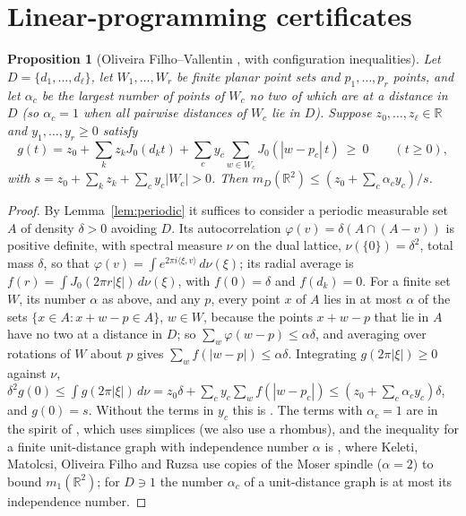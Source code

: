 \documentclass[11pt,a4paper]{amsart}
\newtheorem{proposition}[theorem]{Proposition}
\theoremstyle{definition}
\theoremstyle{remark}
\newcommand{\R}{\mathbb{R}}
\begin{document}
\section{Linear-programming certificates}\label{sec:lp}

\begin{proposition}[Oliveira Filho--Vallentin \cite{OFV}, with configuration inequalities]\label{prop:lp}
Let $D=\{d_1,\dots,d_\ell\}$, let $W_1,\dots,W_r$ be finite planar point sets and $p_1,\dots,p_r$ points, and let
$\alpha_c$ be the largest number of points of $W_c$ no two of which are at a distance in $D$ (so $\alpha_c=1$ when all
pairwise distances of $W_c$ lie in $D$). Suppose $z_0,\dots,z_\ell\in\R$ and $y_1,\dots,y_r\ge0$ satisfy
\[
g(t)=z_0+\sum_{k}z_kJ_0(d_kt)+\sum_cy_c\sum_{w\in W_c}J_0(|w-p_c|\,t)\ \ge\ 0\qquad(t\ge0),
\]
with $s=z_0+\sum_kz_k+\sum_cy_c|W_c|>0$. Then $m_D(\R^2)\le(z_0+\sum_c\alpha_cy_c)/s$.
\end{proposition}

\begin{proof}
By Lemma~\ref{lem:periodic} it suffices to consider a periodic measurable set $A$ of density $\delta>0$ avoiding
$D$. Its autocorrelation $\varphi(v)=\delta(A\cap(A-v))$ is positive definite, with spectral measure $\nu$ on the dual
lattice, $\nu(\{0\})=\delta^2$, total mass $\delta$, so that $\varphi(v)=\int e^{2\pi i\langle\xi,v\rangle}\,d\nu(\xi)$;
its radial average is $f(r)=\int J_0(2\pi r|\xi|)\,d\nu(\xi)$, with
$f(0)=\delta$ and $f(d_k)=0$. For a finite set $W$, its number $\alpha$ as above, and any $p$, every point $x$ of $A$
lies in at most $\alpha$ of the sets $\{x\in A:x+w-p\in A\}$, $w\in W$, because the points $x+w-p$ that lie in $A$
have no two at a distance in $D$; so $\sum_{w}\varphi(w-p)\le\alpha\delta$, and averaging over rotations of $W$ about
$p$ gives $\sum_wf(|w-p|)\le\alpha\delta$. Integrating $g(2\pi|\xi|)\ge0$ against $\nu$,
$\delta^2g(0)\le\int g(2\pi|\xi|)\,d\nu=z_0\delta+\sum_cy_c\sum_wf(|w-p_c|)\le(z_0+\sum_c\alpha_cy_c)\delta$, and
$g(0)=s$. Without the terms in $y_c$ this is \cite[Thm.~1.1]{OFV}. The terms with $\alpha_c=1$ are in the spirit of
\cite[§3.1]{OFV}, which uses simplices (we also use a rhombus), and the inequality for a finite unit-distance graph
with independence number $\alpha$ is \cite[Lemma~3.2]{KMOR}, where Keleti, Matolcsi, Oliveira Filho and Ruzsa use
copies of the Moser spindle ($\alpha=2$) to bound $m_1(\R^2)$; for $D\ni1$ the number $\alpha_c$ of a unit-distance
graph is at most its independence number.
\end{proof}
\end{document}
